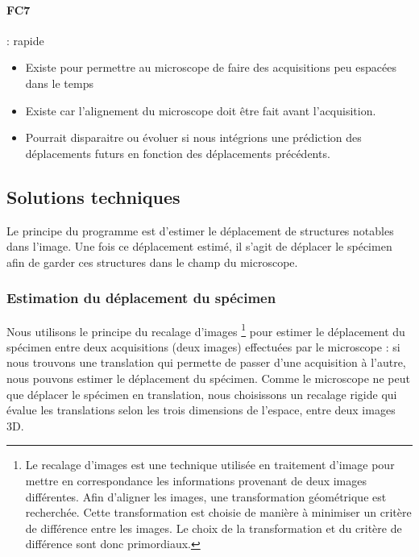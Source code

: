 \paragraph*{FC7} : rapide
\begin{itemize}
  \item Existe pour permettre au microscope de faire des acquisitions peu espacées dans le temps
  \item Existe car l'alignement du microscope doit être fait avant l'acquisition.
  \item Pourrait disparaitre ou évoluer si nous intégrions une prédiction
  des déplacements futurs en fonction des déplacements précédents.
\end{itemize}

\subsection{Solutions techniques}

Le principe du programme est d'estimer le déplacement de structures notables dans l'image.
Une fois ce déplacement estimé, il s'agit de déplacer le spécimen afin de garder ces structures dans le champ du microscope.

\subsubsection{Estimation du déplacement du spécimen}
Nous utilisons le principe du recalage d'images
\footnote{Le recalage d'images est une technique utilisée en traitement d'image pour mettre en correspondance les informations
provenant de deux images différentes. Afin d'aligner les images, une transformation géométrique est recherchée.
Cette transformation est choisie de manière à minimiser un critère de différence entre les images.
Le choix de la transformation et du critère de différence sont donc primordiaux.}
 pour estimer le déplacement du spécimen entre deux acquisitions (deux images) effectuées par le microscope : si nous trouvons une translation qui permette de passer d'une acquisition à l'autre, nous pouvons estimer le déplacement du spécimen.
Comme le microscope ne peut que déplacer le spécimen en translation, nous choisissons un recalage rigide qui évalue les translations selon les trois dimensions de l'espace, entre deux images 3D.

